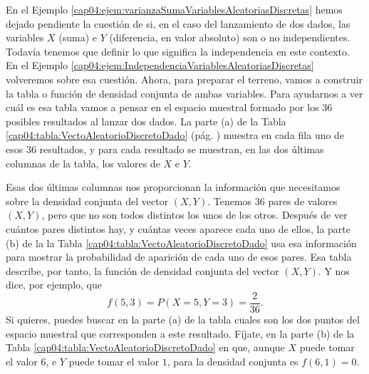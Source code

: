 \begin{ejemplo}
\label{cap04:ejem:VectoAleatorioDiscretoDado}
En el Ejemplo \ref{cap04:ejem:varianzaSumaVariablesAleatoriasDiscretas} hemos dejado pendiente la cuestión de si, en el caso del lanzamiento de dos dados, las variables $X$ (suma) e $Y$ (diferencia, en valor absoluto) son o no independientes. Todavía tenemos que definir lo que significa la independencia en este contexto. En el Ejemplo \ref{cap04:ejem:IndependenciaVariablesAleatoriasDiscretas} volveremos sobre esa cuestión. Ahora, para preparar el terreno, vamos a construir la tabla o función de densidad conjunta de ambas variables. Para ayudarnos a ver cuál es esa tabla vamos a pensar en el espacio muestral formado por los $36$ posibles resultados al lanzar dos dados. La parte (a) de la Tabla \ref{cap04:tabla:VectoAleatorioDiscretoDado} (pág. \pageref{cap04:tabla:VectoAleatorioDiscretoDado}) muestra en cada fila uno de esos $36$ resultados, y para cada resultado se muestran, en las dos últimas columnas de la tabla, los valores de $X$ e $Y$.

Esas dos últimas columnas nos proporcionan la información que necesitamos sobre la densidad conjunta del vector $(X,Y)$. Tenemos 36 pares de valores $(X, Y)$, pero que no son todos distintos los unos de los otros. Después de ver cuántos pares distintos hay, y cuántas veces aparece cada uno de ellos, la parte (b) de la la Tabla \ref{cap04:tabla:VectoAleatorioDiscretoDado} usa esa información para mostrar la probabilidad de aparición de cada uno de esos pares. Esa tabla describe, por tanto, la función de densidad conjunta del vector $(X, Y)$. Y nos dice, por ejemplo, que
\[f(5,3) = P(X=5, Y=3) = \dfrac{2}{36}.\]
Si quieres, puedes buscar en la parte (a) de la tabla cuales son los dos puntos del espacio muestral que corresponden a este resultado. Fíjate, en la parte (b) de la Tabla \ref{cap04:tabla:VectoAleatorioDiscretoDado} en que, aunque $X$ puede tomar el valor $6$, e $Y$ puede tomar el valor $1$, para la densidad conjunta es $f(6,1)=0$.


\end{ejemplo}
